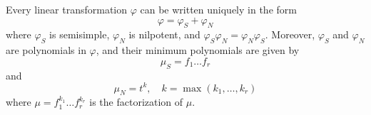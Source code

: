 Every linear transformation $\varphi$ can be written uniquely in the form
$$\varphi = \varphi_S + \varphi_N$$
where $\varphi_S$ is semisimple, $\varphi_N$ is nilpotent, and $\varphi_S \varphi_N = \varphi_N \varphi_S$. Moreover, $\varphi_S$ and $\varphi_N$ are polynomials in $\varphi$, and their minimum polynomials are given by
$$\mu_S = f_1 \ldots f_r$$
and
$$\mu_N = t^k, \quad k = \max(k_1, \ldots, k_r)$$
where $\mu = f_1^{k_1} \ldots f_r^{k_r}$ is the factorization of $\mu$.
